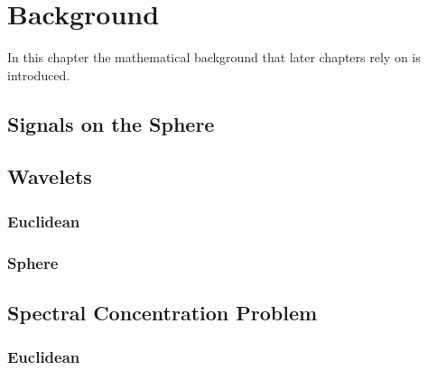 \chapter{Background}\label{sec:chapter2}

In this chapter the mathematical background that later chapters rely on is introduced.

\section{Signals on the Sphere}



\section{Wavelets}

\subsection{Euclidean}

\subsection{Sphere}



\section{Spectral Concentration Problem}

\subsection{Euclidean}

